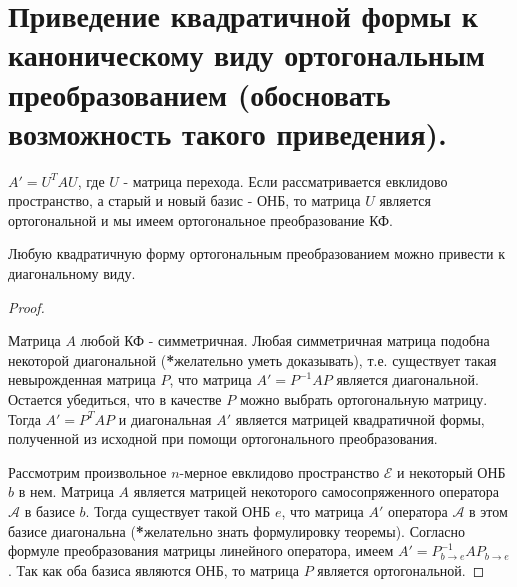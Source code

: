 \section{
    Приведение квадратичной формы к каноническому виду ортогональным преобразованием (обосновать возможность такого приведения).
}

$A' = U^TAU$, где $U$ - матрица перехода. Если рассматривается евклидово пространство, а старый и новый базис - ОНБ, то матрица $U$ является ортогональной и мы имеем ортогональное преобразование КФ.

\begin{theorem} 
    Любую квадратичную форму ортогональным преобразованием можно привести к диагональному виду.
\end{theorem}

\begin{proof}~

    Матрица $A$ любой КФ - симметричная. Любая симметричная матрица подобна некоторой диагональной (\textbf{*}желательно уметь доказывать), т.е. существует такая невырожденная матрица $P$, что матрица $A' = P^{-1}AP$ является диагональной. Остается убедиться, что в качестве $P$ можно выбрать ортогональную матрицу. Тогда $A' = P^TAP$ и диагональная $A'$ является матрицей квадратичной формы, полученной из исходной при помощи ортогонального преобразования.

    Рассмотрим произвольное $n$-мерное евклидово пространство $\mathcal{E}$ и некоторый ОНБ $b$ в нем. Матрица $A$ является матрицей некоторого самосопряженного оператора $\mathscr{A}$ в базисе $b$. Тогда существует такой ОНБ $e$, что матрица $A'$ оператора $\mathscr{A}$ в этом базисе диагональна (\textbf{*}желательно знать формулировку теоремы). Согласно формуле преобразования матрицы линейного оператора, имеем $A' = P_{b \to e}^{-1}AP_{b \to e}$. Так как оба базиса являются ОНБ, то матрица $P$ является ортогональной.
\end{proof}
